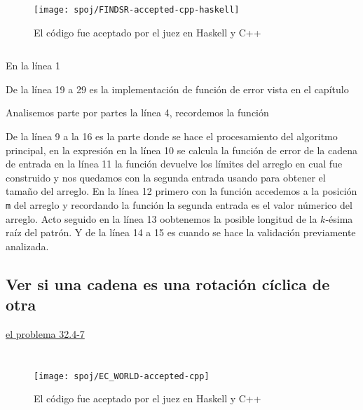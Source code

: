 \begin{figure}[h]
\centering
\texttt{[image: spoj/FINDSR-accepted-cpp-haskell]}
\caption{El código fue aceptado por el juez en Haskell y C++}
\end{figure}

\inputminted[linenos, frame=lines]{haskell}{problemas/haskell/FINDSR.hs}
\pagebreak


En la línea 1 %

De la línea 19 a 29 es la implementación de función de error vista en el capítulo %

Analisemos parte por partes la línea 4, recordemos la función \\

De la línea 9 a la 16 es la parte donde se hace el procesamiento del algoritmo principal,
en la expresión  %
en la línea 10 se calcula la función de error de la cadena de entrada
en la línea 11 la función  devuelve los límites del arreglo en cual fue construido y nos quedamos
con la segunda entrada usando  para obtener el tamaño del arreglo.
En la línea 12 primero con la función  accedemos a la posición \texttt{m} del arreglo y recordando
la función  la segunda entrada es el valor númerico del arreglo.
Acto seguido en la línea 13 oobtenemos  la posible longitud de la $k$-ésima
raíz del patrón. Y de la línea 14 a 15 es cuando se hace la validación previamente analizada.


\subsection{Ver si una cadena es una rotación cíclica de otra}
\hyperlink{cyclic_rotation}{el problema 32.4-7}


\inputminted[linenos, frame=lines, fontsize=\footnotesize]{cpp}{problemas/cpp/EC_WORLD.cpp}
\pagebreak

\inputminted[linenos, frame=lines]{haskell}{problemas/haskell/EC_WORLD.hs}
\pagebreak

\begin{figure}[h]
\centering
\texttt{[image: spoj/EC\_WORLD-accepted-cpp]}
\caption{El código fue aceptado por el juez en Haskell y C++}
\end{figure}

